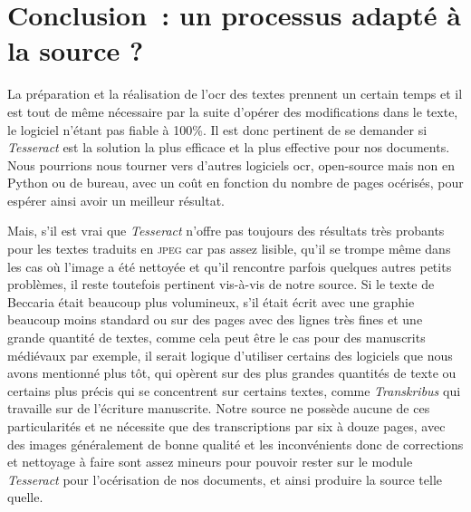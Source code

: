 \section*{Conclusion~: un processus adapté à la source ?}
La préparation et la réalisation de l'\acrshort{ocr} des textes prennent un certain temps et il est tout de même nécessaire par la suite d'opérer des modifications dans le texte, le logiciel n'étant pas fiable à 100\%. Il est donc pertinent de se demander si \emph{Tesseract} est la solution la plus efficace et la plus effective pour nos documents. Nous pourrions nous tourner vers d'autres logiciels \acrshort{ocr}, open-source mais non en Python ou de bureau, avec un coût en fonction du nombre de pages océrisés, pour espérer ainsi avoir un meilleur résultat.

Mais, s'il est vrai que \emph{Tesseract} n'offre pas toujours des résultats très probants pour les textes traduits en \textsc{jpeg} car pas assez lisible, qu'il se trompe même dans les cas où l'image a été nettoyée et qu'il rencontre parfois quelques autres petits problèmes, il reste toutefois pertinent vis-à-vis de notre source. Si le texte de Beccaria était beaucoup plus volumineux, s'il était écrit avec une graphie beaucoup moins standard ou sur des pages avec des lignes très fines et une grande quantité de textes, comme cela peut être le cas pour des manuscrits médiévaux par exemple, il serait logique d'utiliser certains des logiciels que nous avons mentionné plus tôt, qui opèrent sur des plus grandes quantités de texte ou certains plus précis qui se concentrent sur certains textes, comme \emph{Transkribus} qui travaille sur de l'écriture manuscrite. Notre source ne possède aucune de ces particularités et ne nécessite que des transcriptions par six à douze pages, avec des images généralement de bonne qualité et les inconvénients donc de corrections et nettoyage à faire sont assez mineurs pour pouvoir rester sur le module \emph{Tesseract} pour l'océrisation de nos documents, et ainsi produire la source telle quelle.
